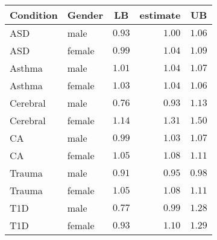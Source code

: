 \begin{table}[!tbp]
\begin{center}
\begin{tabular}{llrrr}
\hline\hline
\multicolumn{1}{c}{Condition}&\multicolumn{1}{c}{Gender}&\multicolumn{1}{c}{LB}&\multicolumn{1}{c}{estimate}&\multicolumn{1}{c}{UB}\tabularnewline
\hline
ASD&male&$0.93$&$1.00$&$1.06$\tabularnewline
ASD&female&$0.99$&$1.04$&$1.09$\tabularnewline
Asthma&male&$1.01$&$1.04$&$1.07$\tabularnewline
Asthma&female&$1.03$&$1.04$&$1.06$\tabularnewline
Cerebral&male&$0.76$&$0.93$&$1.13$\tabularnewline
Cerebral&female&$1.14$&$1.31$&$1.50$\tabularnewline
CA&male&$0.99$&$1.03$&$1.07$\tabularnewline
CA&female&$1.05$&$1.08$&$1.11$\tabularnewline
Trauma&male&$0.91$&$0.95$&$0.98$\tabularnewline
Trauma&female&$1.05$&$1.08$&$1.11$\tabularnewline
T1D&male&$0.77$&$0.99$&$1.28$\tabularnewline
T1D&female&$0.93$&$1.10$&$1.29$\tabularnewline
\hline
\end{tabular}\end{center}
\end{table}
